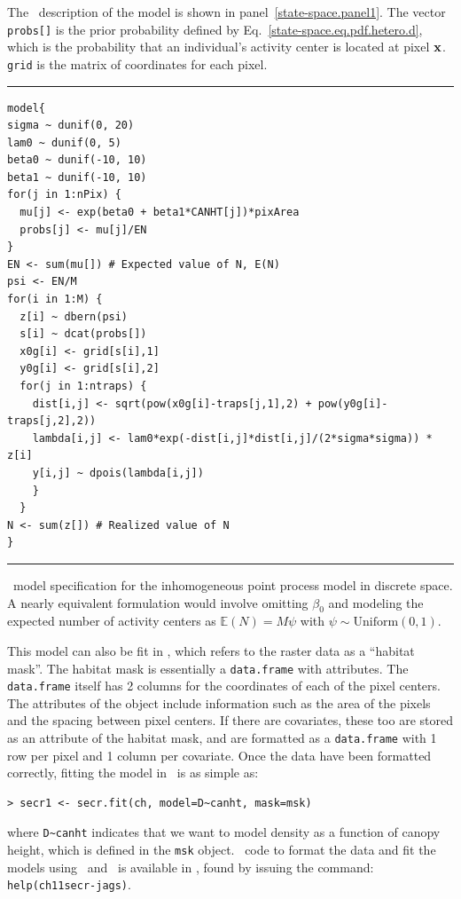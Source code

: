 The \bugs~description of the model is shown in
panel~\ref{state-space.panel1}. The vector \verb+probs[]+ is the prior
probability defined by Eq.~\ref{state-space.eq.pdf.hetero.d}, which is
the probability that an individual's activity center is located at
pixel $\bf x$. \verb+grid+ is the matrix of coordinates for each pixel.

\begin{panel}%
\centering
\rule[0.05in]{\textwidth}{.03in}
\begin{small}
\begin{verbatim}
model{
sigma ~ dunif(0, 20)
lam0 ~ dunif(0, 5)
beta0 ~ dunif(-10, 10)
beta1 ~ dunif(-10, 10)
for(j in 1:nPix) {
  mu[j] <- exp(beta0 + beta1*CANHT[j])*pixArea
  probs[j] <- mu[j]/EN
}
EN <- sum(mu[]) # Expected value of N, E(N)
psi <- EN/M
for(i in 1:M) {
  z[i] ~ dbern(psi)
  s[i] ~ dcat(probs[])
  x0g[i] <- grid[s[i],1]
  y0g[i] <- grid[s[i],2]
  for(j in 1:ntraps) {
    dist[i,j] <- sqrt(pow(x0g[i]-traps[j,1],2) + pow(y0g[i]-traps[j,2],2))
    lambda[i,j] <- lam0*exp(-dist[i,j]*dist[i,j]/(2*sigma*sigma)) * z[i]
    y[i,j] ~ dpois(lambda[i,j])
    }
  }
N <- sum(z[]) # Realized value of N
}
\end{verbatim}
\end{small}
\rule[0.15in]{\textwidth}{.03in}
\caption{\bugs~model specification for the inhomogeneous point process model in
  discrete space. A nearly equivalent formulation would involve
  omitting $\beta_0$ and modeling the expected number of activity
  centers as $\mathbb{E}(N)=M\psi$ with $\psi \sim \text{Uniform}(0,1)$.}
\label{state-space.panel1}
\end{panel}

This model can also be fit in \secr, which refers
to the raster data as a ``habitat mask''. The habitat mask is
essentially a \verb+data.frame+ with attributes. The \verb+data.frame+
itself has 2 columns for the coordinates of each of the pixel
centers. The attributes of the object include information such as the
area of the pixels and the spacing between pixel centers. If there are
covariates, these too are stored as an attribute of the habitat mask,
and are formatted as a \verb+data.frame+ with 1 row per pixel and 1
column per covariate. Once the data have been formatted
correctly, fitting the model in \secr~is as simple as:
\begin{verbatim}
> secr1 <- secr.fit(ch, model=D~canht, mask=msk)
\end{verbatim}
where \verb+D~canht+ indicates that we want to model density as a
function of canopy height, which is defined in the \verb+msk+ object.
\R~code to format the data and fit the models using \secr~and \jags~is
available in \scrbook, found by issuing the command: \verb#help(ch11secr-jags)#.


